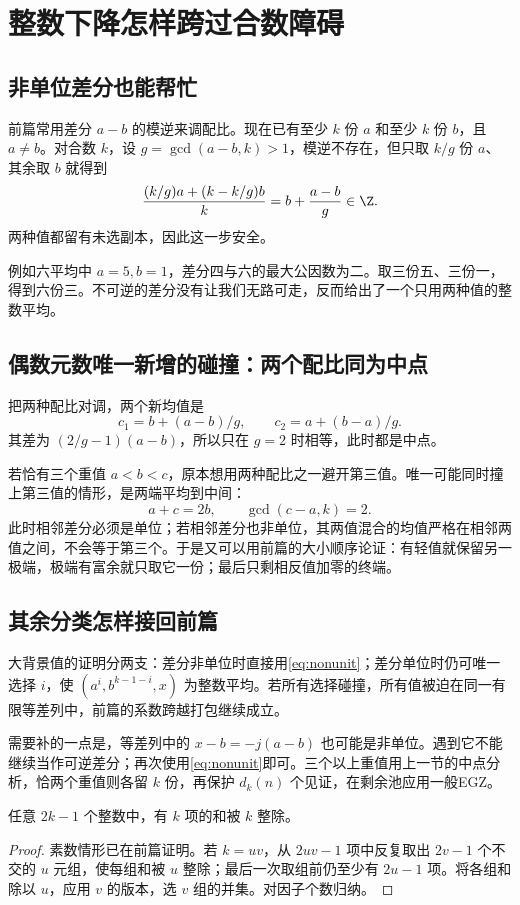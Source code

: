 \chapter{整数下降怎样跨过合数障碍}\label{ch:tail}
\section{非单位差分也能帮忙}
前篇常用差分 $a-b$ 的模逆来调配比。现在已有至少 $k$ 份 $a$ 和至少 $k$ 份 $b$，且 $a\ne b$。对合数 $k$，设 $g=\gcd(a-b,k)>1$，模逆不存在，但只取 $k/g$ 份 $a$、其余取 $b$ 就得到
\begin{equation}\label{eq:nonunit}
\frac{(k/g)a+(k-k/g)b}{k}=b+\frac{a-b}{g}\in\Z.
\end{equation}
两种值都留有未选副本，因此这一步安全。

例如六平均中 $a=5,b=1$，差分四与六的最大公因数为二。取三份五、三份一，得到六份三。不可逆的差分没有让我们无路可走，反而给出了一个只用两种值的整数平均。

\section{偶数元数唯一新增的碰撞：两个配比同为中点}
把两种配比对调，两个新均值是
\[c_1=b+(a-b)/g,\qquad c_2=a+(b-a)/g.
\]
其差为 $(2/g-1)(a-b)$，所以只在 $g=2$ 时相等，此时都是中点。

若恰有三个重值 $a<b<c$，原本想用两种配比之一避开第三值。唯一可能同时撞上第三值的情形，是两端平均到中间：
\[a+c=2b,\qquad\gcd(c-a,k)=2.
\]
此时相邻差分必须是单位；若相邻差分也非单位，其两值混合的均值严格在相邻两值之间，不会等于第三个。于是又可以用前篇的大小顺序论证：有轻值就保留另一极端，极端有富余就只取它一份；最后只剩相反值加零的终端。

\section{其余分类怎样接回前篇}
大背景值的证明分两支：差分非单位时直接用\eqref{eq:nonunit}；差分单位时仍可唯一选择 $i$，使 $(a^i,b^{k-1-i},x)$ 为整数平均。若所有选择碰撞，所有值被迫在同一有限等差列中，前篇的系数跨越打包继续成立。

需要补的一点是，等差列中的 $x-b=-j(a-b)$ 也可能是非单位。遇到它不能继续当作可逆差分；再次使用\eqref{eq:nonunit}即可。三个以上重值用上一节的中点分析，恰两个重值则各留 $k$ 份，再保护 $d_k(n)$ 个见证，在剩余池应用一般EGZ。

\begin{lemma}[一般EGZ由素数版本推出]
任意 $2k-1$ 个整数中，有 $k$ 项的和被 $k$ 整除。
\end{lemma}
\begin{proof}
素数情形已在前篇证明。若 $k=uv$，从 $2uv-1$ 项中反复取出 $2v-1$ 个不交的 $u$ 元组，使每组和被 $u$ 整除；最后一次取组前仍至少有 $2u-1$ 项。将各组和除以 $u$，应用 $v$ 的版本，选 $v$ 组的并集。对因子个数归纳。
\end{proof}

